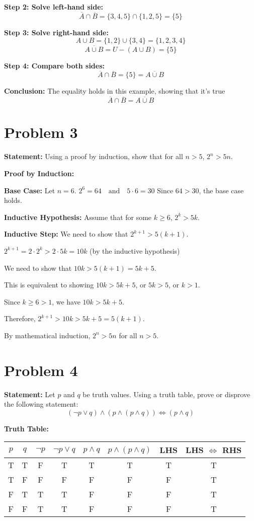 \documentclass{article}
\begin{document}
\textbf{Step 2: Solve left-hand side:}  
\[
\overline{A} \cap \overline{B} = \{3,4,5\} \cap \{1,2,5\} = \{5\}
\]

\textbf{Step 3: Solve right-hand side:}  
\[
A \cup B = \{1,2\} \cup \{3,4\} = \{1,2,3,4\}
\]  
\[
\overline{A \cup B} = U - (A \cup B) = \{5\}
\]

\textbf{Step 4: Compare both sides:}  
\[
\overline{A} \cap \overline{B} = \{5\} = \overline{A \cup B}
\]

\textbf{Conclusion:} The equality holds in this example, showing that it's true
\[
\overline{A} \cap \overline{B} = \overline{A \cup B}
\] 

\section*{Problem 3}

\textbf{Statement:} Using a proof by induction, show that for all $n > 5$, $2^n > 5n$.


\textbf{Proof by Induction:}

\textbf{Base Case:} Let $n = 6$.
$2^6 = 64 \quad \text{and} \quad 5 \cdot 6 = 30$
Since $64 > 30$, the base case holds.

\textbf{Inductive Hypothesis:} Assume that for some $k \geq 6$, $2^k > 5k$.

\textbf{Inductive Step:} We need to show that $2^{k+1} > 5(k+1)$.

$2^{k+1} = 2 \cdot 2^k > 2 \cdot 5k = 10k$
(by the inductive hypothesis)

We need to show that $10k > 5(k+1) = 5k + 5$.

This is equivalent to showing $10k > 5k + 5$, or $5k > 5$, or $k > 1$.

Since $k \geq 6 > 1$, we have $10k > 5k + 5$.

Therefore, $2^{k+1} > 10k > 5k + 5 = 5(k+1)$.

By mathematical induction, $2^n > 5n$ for all $n > 5$.

\section*{Problem 4}

\textbf{Statement:} Let $p$ and $q$ be truth values. Using a truth table, prove or disprove the following statement:
$$(\neg p \vee q) \wedge (p \wedge (p \wedge q)) \Leftrightarrow (p \wedge q)$$

\textbf{Truth Table:}

\begin{center}
    \begin{tabular}{|c|c|c|c|c|c|c|c|}
    \hline
    $p$ & $q$ & $\neg p$ & $\neg p \vee q$ & $p \wedge q$ & $p \wedge (p \wedge q)$ & LHS & LHS $\Leftrightarrow$ RHS \\
    \hline
    T & T & F & T & T & T & T & T \\
    T & F & F & F & F & F & F & T \\
    F & T & T & T & F & F & F & T \\
    F & F & T & T & F & F & F & T \\
    \hline
    \end{tabular}
    \end{center}
    
\end{document}
